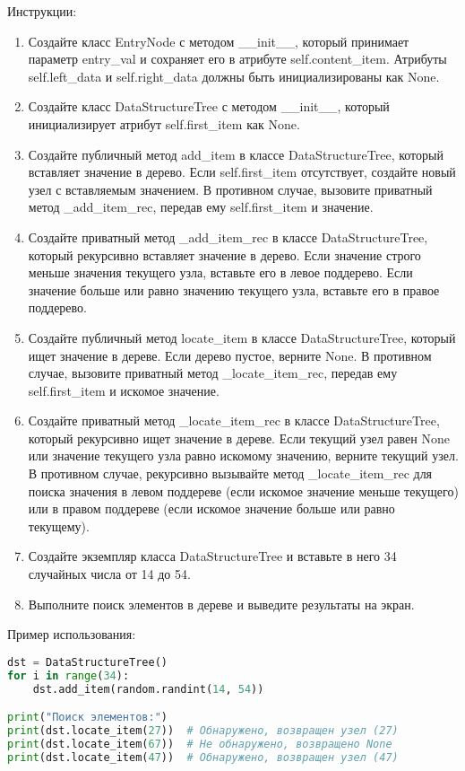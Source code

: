 \begin{enumerate}
Инструкции:
\begin{enumerate}
    \item Создайте класс EntryNode с методом \_\_init\_\_, который принимает параметр entry\_val и сохраняет его в атрибуте self.content\_item. Атрибуты self.left\_data и self.right\_data должны быть инициализированы как None.
    \item Создайте класс DataStructureTree с методом \_\_init\_\_, который инициализирует атрибут self.first\_item как None.
    \item Создайте публичный метод add\_item в классе DataStructureTree, который вставляет значение в дерево. Если self.first\_item отсутствует, создайте новый узел с вставляемым значением. В противном случае, вызовите приватный метод \_add\_item\_rec, передав ему self.first\_item и значение.
    \item Создайте приватный метод \_add\_item\_rec в классе DataStructureTree, который рекурсивно вставляет значение в дерево. Если значение строго меньше значения текущего узла, вставьте его в левое поддерево. Если значение больше или равно значению текущего узла, вставьте его в правое поддерево.
    \item Создайте публичный метод locate\_item в классе DataStructureTree, который ищет значение в дереве. Если дерево пустое, верните None. В противном случае, вызовите приватный метод \_locate\_item\_rec, передав ему self.first\_item и искомое значение.
    \item Создайте приватный метод \_locate\_item\_rec в классе DataStructureTree, который рекурсивно ищет значение в дереве. Если текущий узел равен None или значение текущего узла равно искомому значению, верните текущий узел. В противном случае, рекурсивно вызывайте метод \_locate\_item\_rec для поиска значения в левом поддереве (если искомое значение меньше текущего) или в правом поддереве (если искомое значение больше или равно текущему).
    \item Создайте экземпляр класса DataStructureTree и вставьте в него 34 случайных числа от 14 до 54.
    \item Выполните поиск элементов в дереве и выведите результаты на экран.
\end{enumerate}

Пример использования:
\begin{lstlisting}[language=Python]
dst = DataStructureTree()
for i in range(34):
    dst.add_item(random.randint(14, 54))

print("Поиск элементов:")
print(dst.locate_item(27))  # Обнаружено, возвращен узел (27)
print(dst.locate_item(67))  # Не обнаружено, возвращено None
print(dst.locate_item(47))  # Обнаружено, возвращен узел (47)
\end{lstlisting}


\end{enumerate}
